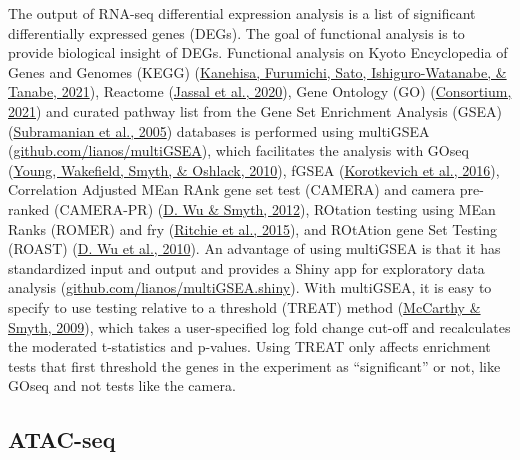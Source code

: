 \documentclass[12pt,twoside]{reedthesis}
\begin{document}
The output of RNA-seq differential expression analysis is a list of
significant differentially expressed genes (DEGs). The goal of
functional analysis is to provide biological insight of DEGs. Functional
analysis on Kyoto Encyclopedia of Genes and Genomes (KEGG)
(\protect\hyperlink{ref-kanehisa2021}{Kanehisa, Furumichi, Sato, Ishiguro-Watanabe, \& Tanabe, 2021}), Reactome (\protect\hyperlink{ref-jassal2020}{Jassal et al., 2020}), Gene Ontology (GO)
(\protect\hyperlink{ref-consortium2021}{Consortium, 2021}) and curated pathway list from the Gene Set Enrichment
Analysis (GSEA) (\protect\hyperlink{ref-subramanian2005}{Subramanian et al., 2005}) databases is performed using
multiGSEA (\href{https://github.com/lianos/multiGSEA}{github.com/lianos/multiGSEA}), which facilitates the
analysis with GOseq (\protect\hyperlink{ref-young2010}{Young, Wakefield, Smyth, \& Oshlack, 2010}), fGSEA (\protect\hyperlink{ref-korotkevich2016}{Korotkevich et al., 2016}), Correlation
Adjusted MEan RAnk gene set test (CAMERA) and camera pre-ranked
(CAMERA-PR) (\protect\hyperlink{ref-wu2012}{D. Wu \& Smyth, 2012}), ROtation testing using MEan Ranks (ROMER) and fry
(\protect\hyperlink{ref-ritchie2015}{Ritchie et al., 2015}), and ROtAtion gene Set Testing (ROAST) (\protect\hyperlink{ref-wu2010}{D. Wu et al., 2010}). An
advantage of using multiGSEA is that it has standardized input and
output and provides a Shiny app for exploratory data analysis (\href{https://github.com/lianos/multiGSEA.shiny}{github.com/lianos/multiGSEA.shiny}). With multiGSEA, it is
easy to specify to use testing relative to a threshold (TREAT) method
(\protect\hyperlink{ref-mccarthy2009}{McCarthy \& Smyth, 2009}), which takes a user-specified log fold change cut-off
and recalculates the moderated t-statistics and p-values. Using TREAT
only affects enrichment tests that first threshold the genes in the
experiment as ``significant'' or not, like GOseq and not tests like the
camera.

\hypertarget{m3.3}{%
\subsection*{ATAC-seq}\label{m3.3}}
\end{document}
